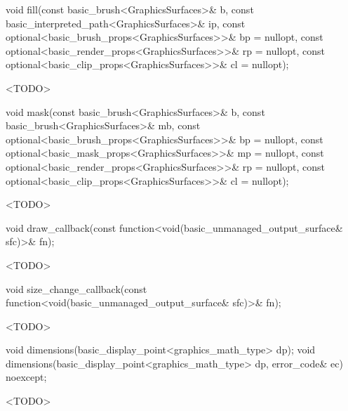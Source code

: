 %
\begin{itemdecl}
void fill(const basic_brush<GraphicsSurfaces>& b,
  const basic_interpreted_path<GraphicsSurfaces>& ip,
  const optional<basic_brush_props<GraphicsSurfaces>>& bp = nullopt,
  const optional<basic_render_props<GraphicsSurfaces>>& rp = nullopt,
  const optional<basic_clip_props<GraphicsSurfaces>>& cl = nullopt);
\end{itemdecl}
\begin{itemdescr}
\pnum
\effects
<TODO>
\end{itemdescr}

%
\begin{itemdecl}
void mask(const basic_brush<GraphicsSurfaces>& b,
  const basic_brush<GraphicsSurfaces>& mb,
  const optional<basic_brush_props<GraphicsSurfaces>>& bp = nullopt,
  const optional<basic_mask_props<GraphicsSurfaces>>& mp = nullopt,
  const optional<basic_render_props<GraphicsSurfaces>>& rp = nullopt,
  const optional<basic_clip_props<GraphicsSurfaces>>& cl = nullopt);
\end{itemdecl}
\begin{itemdescr}
\pnum
\effects
<TODO>
\end{itemdescr}

%
\begin{itemdecl}
void draw_callback(const function<void(basic_unmanaged_output_surface& sfc)>& fn);
\end{itemdecl}
\begin{itemdescr}
\pnum
\effects
<TODO>
\end{itemdescr}

%
\begin{itemdecl}
void size_change_callback(const function<void(basic_unmanaged_output_surface& sfc)>& fn);
\end{itemdecl}
\begin{itemdescr}
\pnum
\effects
<TODO>
\end{itemdescr}

%
\begin{itemdecl}
void dimensions(basic_display_point<graphics_math_type> dp);
void dimensions(basic_display_point<graphics_math_type> dp, error_code& ec) noexcept;
\end{itemdecl}
\begin{itemdescr}
\pnum
\effects
<TODO>
\end{itemdescr}

